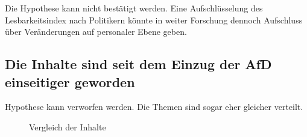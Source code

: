 Die Hypothese kann nicht bestätigt werden. Eine Aufschlüsselung des
Lesbarkeitsindex nach Politikern könnte in weiter Forschung dennoch Aufschluss über
Veränderungen auf personaler Ebene geben.\\
\newpage

\subsection{Die Inhalte sind seit dem Einzug der AfD einseitiger geworden}

Hypothese kann verworfen werden. Die Themen sind sogar eher gleicher verteilt. 

\begin{figure} [h]
	\caption{Vergleich der Inhalte}
\end{figure}

